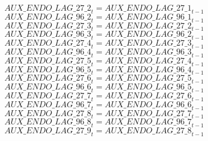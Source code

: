 \begin{dmath}
{AUX\_ENDO\_LAG\_27\_2}_{t}={AUX\_ENDO\_LAG\_27\_1}_{t-1}
\end{dmath}
\begin{dmath}
{AUX\_ENDO\_LAG\_96\_2}_{t}={AUX\_ENDO\_LAG\_96\_1}_{t-1}
\end{dmath}
\begin{dmath}
{AUX\_ENDO\_LAG\_27\_3}_{t}={AUX\_ENDO\_LAG\_27\_2}_{t-1}
\end{dmath}
\begin{dmath}
{AUX\_ENDO\_LAG\_96\_3}_{t}={AUX\_ENDO\_LAG\_96\_2}_{t-1}
\end{dmath}
\begin{dmath}
{AUX\_ENDO\_LAG\_27\_4}_{t}={AUX\_ENDO\_LAG\_27\_3}_{t-1}
\end{dmath}
\begin{dmath}
{AUX\_ENDO\_LAG\_96\_4}_{t}={AUX\_ENDO\_LAG\_96\_3}_{t-1}
\end{dmath}
\begin{dmath}
{AUX\_ENDO\_LAG\_27\_5}_{t}={AUX\_ENDO\_LAG\_27\_4}_{t-1}
\end{dmath}
\begin{dmath}
{AUX\_ENDO\_LAG\_96\_5}_{t}={AUX\_ENDO\_LAG\_96\_4}_{t-1}
\end{dmath}
\begin{dmath}
{AUX\_ENDO\_LAG\_27\_6}_{t}={AUX\_ENDO\_LAG\_27\_5}_{t-1}
\end{dmath}
\begin{dmath}
{AUX\_ENDO\_LAG\_96\_6}_{t}={AUX\_ENDO\_LAG\_96\_5}_{t-1}
\end{dmath}
\begin{dmath}
{AUX\_ENDO\_LAG\_27\_7}_{t}={AUX\_ENDO\_LAG\_27\_6}_{t-1}
\end{dmath}
\begin{dmath}
{AUX\_ENDO\_LAG\_96\_7}_{t}={AUX\_ENDO\_LAG\_96\_6}_{t-1}
\end{dmath}
\begin{dmath}
{AUX\_ENDO\_LAG\_27\_8}_{t}={AUX\_ENDO\_LAG\_27\_7}_{t-1}
\end{dmath}
\begin{dmath}
{AUX\_ENDO\_LAG\_96\_8}_{t}={AUX\_ENDO\_LAG\_96\_7}_{t-1}
\end{dmath}
\begin{dmath}
{AUX\_ENDO\_LAG\_27\_9}_{t}={AUX\_ENDO\_LAG\_27\_8}_{t-1}
\end{dmath}
